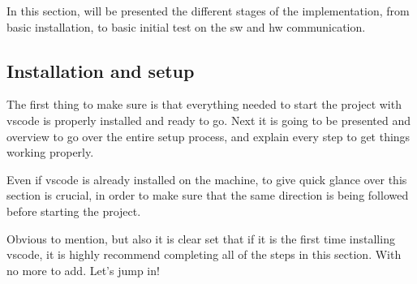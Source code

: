 In this section, will be presented the different stages of the implementation, from basic installation, to basic initial test on the \ac{sw} and \ac{hw} communication.

\subsection{Installation and setup}
The first thing to make sure is that everything needed to start the project with \ac{vscode} is properly installed and ready to go. Next it is going to be presented and overview to go over the entire setup process, and explain every step to get things working properly.

Even if \ac{vscode} is already installed on the machine, to give quick glance over this section is crucial, in order to make sure that the same direction is being followed before starting the project. 

Obvious to mention, but also it is clear set that if it is the first time installing \ac{vscode}, it is highly recommend completing all of the steps in this section. With no more to add. Let’s jump in!


